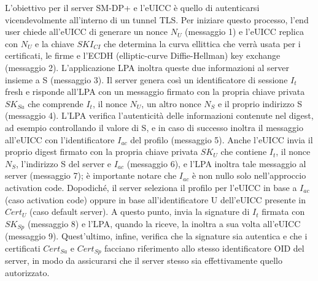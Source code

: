 \documentclass[10pt, twoside, openany]{book}
\begin{document}
\begin{itemize}
L'obiettivo per il server SM-DP+ e l'eUICC è quello di autenticarsi vicendevolmente all'interno di un tunnel TLS. Per iniziare questo processo, l'end user chiede all'eUICC di generare un nonce $N_{U}$ (messaggio 1) e l'eUICC replica con $N_{U}$ e la chiave $SKI_{CI}$ che determina la curva ellittica che verrà usata per i certificati, le firme e l'ECDH (elliptic-curve Diffie-Hellman) key exchange (messaggio 2). L'applicazione LPA inoltra queste due informazioni al server insieme a S (messaggio 3). Il server genera così un identificatore di sessione $I_{t}$ fresh e risponde all'LPA con un messaggio firmato con la propria chiave privata $SK_{Sa}$ che comprende $I_{t}$, il nonce $N_{U}$, un altro nonce $N_{S}$ e il proprio indirizzo S (messaggio 4). L'LPA verifica l'autenticità delle informazioni contenute nel digest, ad esempio controllando il valore di S, e in caso di successo inoltra il messaggio all'eUICC con l'identificatore $I_{ac}$ del profilo (messaggio 5). Anche l'eUICC invia il proprio digest firmato con la propria chiave privata $SK_{U}$ che contiene $I_{t}$, il nonce $N_{S}$, l'indirizzo S del server e $I_{ac}$ (messaggio 6), e l'LPA inoltra tale messaggio al server (messaggio 7); è importante notare che $I_{ac}$ è non nullo solo nell'approccio activation code. Dopodiché, il server seleziona il profilo per l'eUICC in base a $I_{ac}$ (caso activation code) oppure in base all'identificatore U dell'eUICC presente in $Cert_{U}$ (caso default server). A questo punto, invia la signature di $I_{t}$ firmata con $SK_{Sp}$ (messaggio 8) e l'LPA, quando la riceve, la inoltra a sua volta all'eUICC (messaggio 9). Quest'ultimo, infine, verifica che la signature sia autentica e che i certificati $Cert_{Sa}$ e $Cert_{Sp}$ facciano riferimento allo stesso identificatore OID del server, in modo da assicurarsi che il server stesso sia effettivamente quello autorizzato.

\end{itemize}
\end{document}
